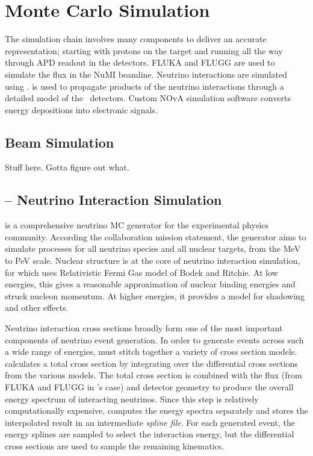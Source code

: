\chapter{Monte Carlo Simulation}
\label{sim_chapter}


The \nova simulation chain involves many components to deliver an accurate representation; starting with protons on the \numi target and running all the way through APD readout in the \nova detectors.  FLUKA and FLUGG are used to simulate the flux in the NuMI beamline.  \cite{fluka}  Neutrino interactions are simulated using \genie.\cite{genie}  \geant is used to propagate products of the neutrino interactions through a detailed model of the \nova~detectors.\cite{geant}  Custom NOvA simulation software converts energy depositions into electronic signals.


\section{Beam Simulation}


Stuff here.  Gotta figure out what.

\section{\genie -- Neutrino Interaction Simulation}

\genie is a comprehensive neutrino MC generator for the experimental physics community.  According the \genie collaboration mission statement, the generator aims to simulate processes  for all neutrino species and all nuclear targets, from the MeV to PeV scale.  Nuclear structure is at the core of neutrino interaction simulation, for which \genie uses  Relativistic Fermi Gas model of Bodek and Ritchie.  \cite{bodekritchie}  At low energies, this gives a reasonable approximation of nuclear binding energies and struck nucleon momentum.  At higher energies, it provides a model for shadowing and other effects.

Neutrino interaction cross sections broadly form one of the most important components of neutrino event generation.  In order to generate events across such a wide range of energies, \genie must stitch together a variety of cross section models.  \genie calculates a total cross section by integrating over the differential cross sections from the various models.  The total cross section is combined with the flux (from FLUKA and FLUGG in \nova's case) and detector geometry to produce the overall energy spectrum of interacting neutrinos.  Since this step is relatively computationally expensive, \genie computes the energy spectra separately and stores the interpolated result in an intermediate \textit{spline file}.  For each generated event, the energy splines are sampled to select the interaction energy, but the differential cross sections are used to sample the remaining kinematics.


